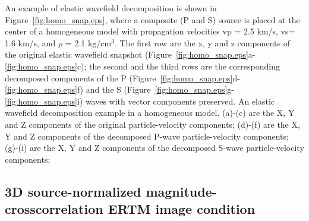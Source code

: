 \documentclass[manuscript,ulem,graphix,revised]{geophysics}
\begin{document}
An example of elastic wavefield decomposition is shown in Figure~\ref{fig:homo_snap.eps}, where a composite (P and S) source is placed at the center of a homogeneous model with propagation velocities vp = 2.5 km/s, vs= 1.6 km/s, and $\rho$ = 2.1 $\mathrm{kg/cm^3}$. The first row are the x, y and z components of the original elastic wavefield snapshot (Figure~\ref{fig:homo_snap.eps}a-\ref{fig:homo_snap.eps}c); the second and the third rows are the corresponding decomposed components of the P (Figure~\ref{fig:homo_snap.eps}d-\ref{fig:homo_snap.eps}f) and the S (Figure~\ref{fig:homo_snap.eps}g-\ref{fig:homo_snap.eps}i) waves with vector components preserved. 
{
An elastic wavefield decomposition example in a homogeneous model.
(a)-(c) are the X, Y and Z components of the original particle-velocity components;
(d)-(f) are the X, Y and Z components of the decomposed P-wave particle-velocity components;
(g)-(i) are the X, Y and Z components of the decomposed S-wave particle-velocity components;
}


\subsection{3D source-normalized magnitude-crosscorrelation ERTM image condition}
\end{document}
